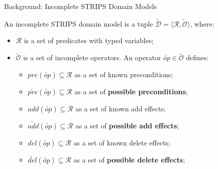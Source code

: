 \documentclass[usenames,dvipsnames]{beamer}
\newcommand{\incp}[1]{\widetilde{\mathcal{#1}}}
\newcommand{\inc}[1]{\widetilde{#1}}
\begin{document}
    \begin{frame}{Background: Incomplete STRIPS Domain Models}
		\begin{definition} 
			An incomplete STRIPS domain model is a tuple $\incp{D} = \langle \mathcal{R}, \incp{O} \rangle$, where:
			\begin{itemize}
				\item $\mathcal{R}$ is a set of predicates with typed variables;
				\item $\incp{O}$ is a set of incomplete operators. An operator $\inc{op} \in \incp{O}$ defines: 
				\begin{itemize}
					\item $pre(\inc{op}) \subseteq \mathcal{R}$ as a set of known preconditions;
					\item<2-> $\widetilde{pre}(\inc{op}) \subseteq \mathcal{R}$ as a set of \textbf{possible preconditions};
					\item $add(\inc{op}) \subseteq \mathcal{R}$ as a set of known add effects;
					\item<2-> $\widetilde{add}(\inc{op}) \subseteq \mathcal{R}$ as a set of \textbf{possible add effects};
					\item $del(\inc{op}) \subseteq \mathcal{R}$ as a set of known delete effects;
					\item<2-> $\widetilde{del}(\inc{op}) \subseteq \mathcal{R}$ as a set of \textbf{possible delete effects};
				\end{itemize}
			\end{itemize}
		\end{definition}
    \end{frame}

%
	
\end{document}
